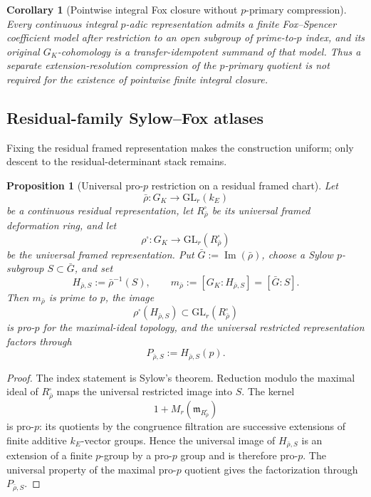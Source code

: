 \documentclass[11pt]{article}
\newtheorem{proposition}[theorem]{Proposition}
\newtheorem{corollary}[theorem]{Corollary}
\theoremstyle{definition}
\begin{document}
\begin{corollary}[Pointwise integral Fox closure without $p$-primary compression]\label{cor:sylow-pointwise-closure}
Every continuous integral $p$-adic representation admits a finite Fox--Spencer coefficient model after restriction to an open subgroup of prime-to-$p$ index, and its original $G_K$-cohomology is a transfer-idempotent summand of that model.  Thus a separate extension-resolution compression of the $p$-primary quotient is not required for the existence of pointwise finite integral closure.
\end{corollary}


\subsection{Residual-family Sylow--Fox atlases}

Fixing the residual framed representation makes the construction uniform; only descent to the residual-determinant stack remains.

\begin{proposition}[Universal pro-$p$ restriction on a residual framed chart]\label{prop:universal-sylow-prop}
Let
\[
\bar\rho:G_K\longrightarrow \mathrm{GL}_r(k_E)
\]
be a continuous residual representation, let $R_{\bar\rho}^{\square}$ be its universal framed deformation ring, and let
\[
\rho^{\square}:G_K\longrightarrow
\mathrm{GL}_r(R_{\bar\rho}^{\square})
\]
be the universal framed representation.  Put $\bar G:=\operatorname{Im}(\bar\rho)$, choose a Sylow $p$-subgroup $S\subset\bar G$, and set
\[
H_{\bar\rho,S}:=\bar\rho^{-1}(S),
\qquad
m_{\bar\rho}:=[G_K:H_{\bar\rho,S}]=[\bar G:S].
\]
Then $m_{\bar\rho}$ is prime to $p$, the image
\[
\rho^{\square}(H_{\bar\rho,S})
\subset
\mathrm{GL}_r(R_{\bar\rho}^{\square})
\]
is pro-$p$ for the maximal-ideal topology, and the universal restricted representation factors through
\[
P_{\bar\rho,S}:=H_{\bar\rho,S}(p).
\]
\end{proposition}

\begin{proof}
The index statement is Sylow's theorem.  Reduction modulo the maximal ideal of $R_{\bar\rho}^{\square}$ maps the universal restricted image into $S$.  The kernel
\[
1+M_r(\mathfrak m_{R_{\bar\rho}^{\square}})
\]
is pro-$p$: its quotients by the congruence filtration are successive extensions of finite additive $k_E$-vector groups.  Hence the universal image of $H_{\bar\rho,S}$ is an extension of a finite $p$-group by a pro-$p$ group and is therefore pro-$p$.  The universal property of the maximal pro-$p$ quotient gives the factorization through $P_{\bar\rho,S}$.
\end{proof}
\end{document}
